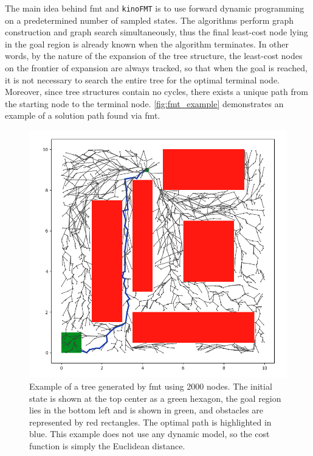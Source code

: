 The main idea behind \gls{fmt} and \texttt{kinoFMT} is to use forward dynamic programming on a predetermined number of sampled states. The algorithms perform graph construction and graph search simultaneously, thus the final least-cost node lying in the goal region is already known when the algorithm terminates. In other words, by the nature of the expansion of the tree structure, the least-cost nodes on the frontier of expansion are always tracked, so that when the goal is reached, it is not necessary to search the entire tree for the optimal terminal node. Moreover, since tree structures contain no cycles, there exists a unique path from the starting node to the terminal node. \autoref{fig:fmt_example} demonstrates an example of a solution path found via \gls{fmt}.

\begin{figure}[!hb]
    \centering
    \includegraphics[scale=0.36]{./figures/fmt-2000-nodes}
    \caption[FMT* Example]{Example of a tree generated by \gls{fmt} using 2000 nodes. The initial state is shown at the top center as a green hexagon, the goal region lies in the bottom left and is shown in green, and obstacles are represented by red rectangles. The optimal path is highlighted in blue. This example does not use any dynamic model, so the cost function is simply the Euclidean distance.}
\label{fig:fmt_example}
\end{figure}

